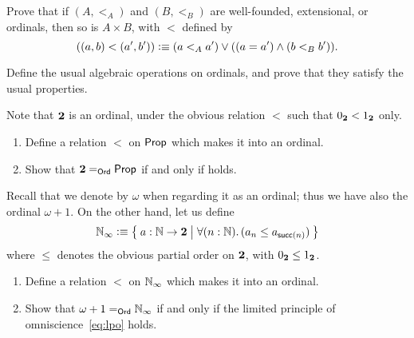\begin{ex}
  Prove that if $(A,<_A)$ and $(B,<_B)$ are well-founded, extensional, or ordinals, then so is $A\times B$, with $<$ defined by
  \[ ((a,b) <(a',b')) \defeq (a<_A a') \vee ((a=a') \wedge (b<_B b')). \]
\end{ex}

\begin{ex}
  Define the usual algebraic operations on ordinals, and prove that they satisfy the usual properties.
\end{ex}

\begin{ex}\label{ex:prop-ord}
  Note that $\bool$ is an ordinal, under the obvious relation $<$ such that $\bfalse<\btrue$ only.
  \begin{enumerate}
  \item Define a relation $<$ on $\prop$ which makes it into an ordinal.
  \item Show that $\id[\ord]\bool\prop$ if and only if \LEM{} holds.
  \end{enumerate}
\end{ex}

\begin{ex}\label{ex:ninf-ord}
  Recall that we denote \nat by $\omega$ when regarding it as an ordinal; thus we have also the ordinal $\omega+1$.
  On the other hand, let us define
  \[ \nat_\infty \defeq \setof{a:\nat\to\bool | \fall{n:\nat} (a_n \le a_{\suc(n)}) } \]
  where $\le$ denotes the obvious partial order on $\bool$, with $\bfalse\le\btrue$.
  \begin{enumerate}
  \item Define a relation $<$ on $\nat_\infty$ which makes it into an ordinal.
  \item Show that $\id[\ord]{\omega+1}{\nat_\infty}$ if and only if the limited principle of omniscience~\eqref{eq:lpo} holds.%
  \end{enumerate}
\end{ex}

